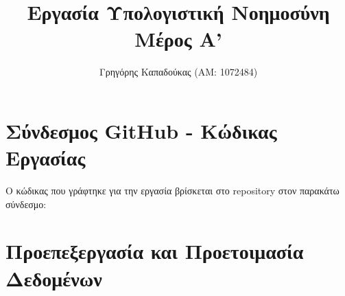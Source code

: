 \documentclass[12pt,a4paper]{article}
\title{Εργασία Υπολογιστική Νοημοσύνη\\Μέρος Α'}
\author{Γρηγόρης Καπαδούκας (ΑΜ: 1072484)}
\begin{document}
\maketitle

\setcounter{section}{-1}
\section{Σύνδεσμος GitHub - Κώδικας Εργασίας}
Ο κώδικας που γράφτηκε για την εργασία βρίσκεται στο repository στον παρακάτω σύνδεσμο:



\section{Προεπεξεργασία και Προετοιμασία Δεδομένων}
\end{document}
